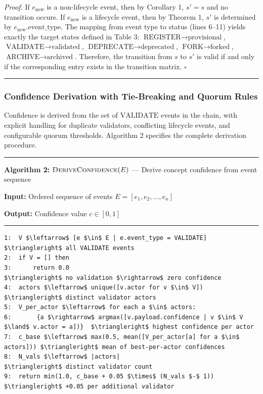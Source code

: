 \emph{Proof.} If \(e_{\text{new}}\) is a non-lifecycle event, then by Corollary 1, \(s' = s\) and no transition occurs. If \(e_{\text{new}}\) is a lifecycle event, then by Theorem 1, \(s'\) is determined by \(e_{\text{new}}.\text{event\_type}\). The mapping from event type to status (lines 6--11) yields exactly the target states defined in Table 3: \(\text{REGISTER} \rightarrow \text{provisional}\), \(\text{VALIDATE} \rightarrow \text{validated}\), \(\text{DEPRECATE} \rightarrow \text{deprecated}\), \(\text{FORK} \rightarrow \text{forked}\), \(\text{ARCHIVE} \rightarrow \text{archived}\). Therefore, the transition from \(s\) to \(s'\) is valid if and only if the corresponding entry exists in the transition matrix. \(\square\)

\begin{center}\rule{0.5\linewidth}{0.5pt}\end{center}

\subsubsection{Confidence Derivation with Tie-Breaking and Quorum Rules}\label{confidence-derivation-with-tie-breaking-and-quorum-rules}

Confidence is derived from the set of \(\text{VALIDATE}\) events in the chain, with explicit handling for duplicate validators, conflicting lifecycle events, and configurable quorum thresholds. Algorithm 2 specifies the complete derivation procedure.

\begin{center}\rule{0.5\linewidth}{0.5pt}\end{center}

\textbf{Algorithm 2:} \(\textsc{DeriveConfidence}(E)\) --- Derive concept confidence from event sequence

\textbf{Input:} Ordered sequence of events \(E = [e_1, e_2, \ldots, e_n]\)

\textbf{Output:} Confidence value \(c \in [0, 1]\)

\begin{center}\rule{0.5\linewidth}{0.5pt}\end{center}

\begin{verbatim}
1:  V $\leftarrow$ [e $\in$ E | e.event_type = VALIDATE]                    $\triangleright$ all VALIDATE events
2:  if V = [] then
3:      return 0.0                                            $\triangleright$ no validation $\rightarrow$ zero confidence
4:  actors $\leftarrow$ unique([v.actor for v $\in$ V])                     $\triangleright$ distinct validator actors
5:  V_per_actor $\leftarrow$ for each a $\in$ actors:
6:       {a $\rightarrow$ argmax([v.payload.confidence | v $\in$ V $\land$ v.actor = a])}  $\triangleright$ highest confidence per actor
7:  c_base $\leftarrow$ max(0.5, mean([V_per_actor[a] for a $\in$ actors])) $\triangleright$ mean of best-per-actor confidences
8:  N_vals $\leftarrow$ |actors|                                         $\triangleright$ distinct validator count
9:  return min(1.0, c_base + 0.05 $\times$ (N_vals $-$ 1))           $\triangleright$ +0.05 per additional validator
\end{verbatim}

